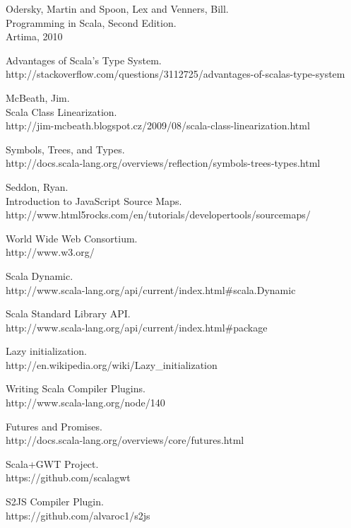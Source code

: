 \begin{thebibliography}{99}
	{\sc Odersky,} Martin and {\sc Spoon,} Lex and {\sc Venners,} Bill.\\  Programming in Scala, Second Edition.\\
	Artima, 2010
	
	Advantages of Scala's Type System.\\
	http://stackoverflow.com/questions/3112725/advantages-of-scalas-type-system
	
  {\sc McBeath}, Jim.\\
	Scala Class Linearization.\\
	http://jim-mcbeath.blogspot.cz/2009/08/scala-class-linearization.html
	
	Symbols, Trees, and Types.\\
	http://docs.scala-lang.org/overviews/reflection/symbols-trees-types.html
	
  {\sc Seddon,} Ryan.\\
	Introduction to JavaScript Source Maps.\\
  http://www.html5rocks.com/en/tutorials/developertools/sourcemaps/
	
  World Wide Web Consortium.\\
	http://www.w3.org/
	
  Scala Dynamic.\\
	http://www.scala-lang.org/api/current/index.html\#scala.Dynamic
	
	Scala Standard Library API.\\
  http://www.scala-lang.org/api/current/index.html\#package
	
  Lazy initialization.\\
	http://en.wikipedia.org/wiki/Lazy\_initialization
	
  Writing Scala Compiler Plugins.\\
  http://www.scala-lang.org/node/140
	
  Futures and Promises.\\
  http://docs.scala-lang.org/overviews/core/futures.html
	
  Scala+GWT Project.\\
  https://github.com/scalagwt
	
  S2JS Compiler Plugin.\\
  https://github.com/alvaroc1/s2js
	

\end{thebibliography}

